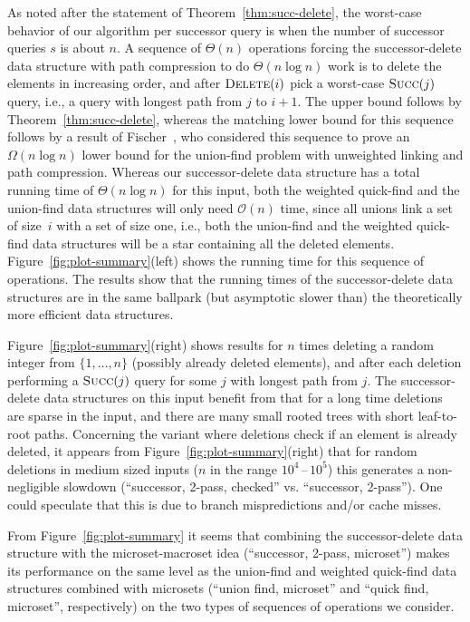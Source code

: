 \documentclass[a4paper]{lipics-v2021}
\newcommand{\Oh}{\mathcal{O}}
\newcommand{\FuncName}[1]{\textup{\textsc{#1}}}
\newcommand{\Delete}{\FuncName{Delete}}
\newcommand{\Succ}{\FuncName{Succ}}
\begin{document}
As noted after the statement of Theorem~\ref{thm:succ-delete}, the worst-case behavior of our algorithm per successor query is when the number of successor queries $s$ is about $n$. A sequence of $\Theta(n)$ operations forcing the successor-delete data structure with path compression to do $\Theta(n\log n)$ work is to delete the elements in increasing order, and after $\Delete(i)$ pick a worst-case $\Succ(j)$ query, i.e., a query with longest path from $j$ to $i+1$. The upper bound follows by Theorem~\ref{thm:succ-delete}, whereas the matching lower bound for this sequence follows by a result of Fischer~\cite[Theorem~1]{Fischer72}, who considered this sequence to prove an $\Omega(n\log n)$ lower bound for the union-find problem with unweighted linking and path compression. Whereas our successor-delete data structure has a total running time of $\Theta(n\log n)$ for this input, both the weighted quick-find and the union-find data structures will only need $\Oh(n)$ time, since all unions link a set of size~$i$ with a set of size one, i.e., both the union-find and the weighted quick-find data structures will be a star containing all the deleted elements. Figure~\ref{fig:plot-summary}(left) shows the running time for this sequence of operations. The results show that the running times of the successor-delete data structures are in the same ballpark (but asymptotic slower than) the theoretically more efficient data structures.

Figure~\ref{fig:plot-summary}(right) shows results for $n$ times deleting a random integer from $\{1,\ldots,n\}$ (possibly already deleted elements), and after each deletion performing a $\Succ(j)$ query for some $j$ with longest path from $j$. The successor-delete data structures on this input benefit from that for a long time deletions are sparse in the input, and there are many small rooted trees with short leaf-to-root paths. Concerning the variant where deletions check if an element is already deleted, it appears from Figure~\ref{fig:plot-summary}(right) that for random deletions in medium sized inputs ($n$ in the range $10^4$\,--\,$10^5$) this generates a non-negligible slowdown  (``successor, 2-pass, checked'' vs. ``successor, 2-pass''). One could speculate that this is due to branch mispredictions and/or cache misses.

From Figure~\ref{fig:plot-summary} it seems that combining the successor-delete data structure with the microset-macroset idea (``successor, 2-pass, microset'') makes its performance on the same level as the union-find and weighted quick-find data structures combined with microsets (``union find, microset'' and ``quick find, microset'', respectively) on the two types of sequences of operations we consider.
\end{document}
